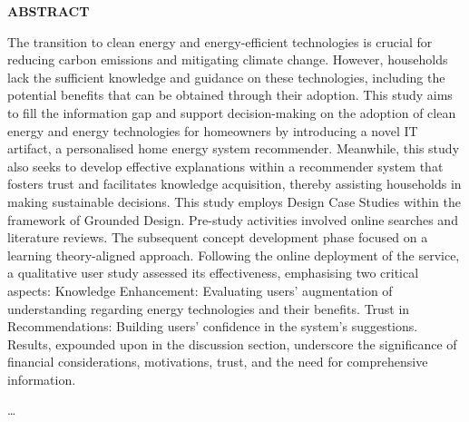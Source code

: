  \setcounter{page}{3}
\begin{center}
{\Large{\bf{ABSTRACT}}}
\end{center}

\noindent

The transition to clean energy and energy-efficient technologies is crucial for reducing carbon emissions and mitigating climate change. 
However, households lack the sufficient knowledge and guidance on these technologies, including the potential benefits that can be obtained through their adoption.
This study aims to fill the information gap and support decision-making on the adoption of clean energy and energy technologies for homeowners by introducing a novel IT artifact, a personalised home energy system recommender.
Meanwhile, this study also seeks to develop effective explanations within a recommender system that fosters trust and facilitates knowledge acquisition, thereby assisting households in making sustainable decisions.
This study employs Design Case Studies within the framework of Grounded Design. 
Pre-study activities involved online searches and literature reviews. 
The subsequent concept development phase focused on a learning theory-aligned approach. 
Following the online deployment of the service, a qualitative user study assessed its effectiveness, emphasising two critical aspects: 
Knowledge Enhancement: Evaluating users' augmentation of understanding regarding energy technologies and their benefits.
Trust in Recommendations: Building users' confidence in the system's suggestions.
Results, expounded upon in the discussion section, underscore the significance of financial considerations, motivations, trust, and the need for comprehensive information. 


\dots
\clearpage
